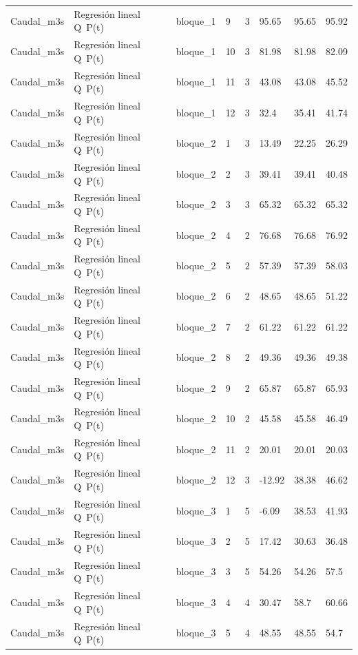 \begin{longtable}{llllllll}
Caudal\_m3s & Regresión lineal Q~P(t) & bloque\_1 & 9 & 3 & 95.65 & 95.65 & 95.92 \\
Caudal\_m3s & Regresión lineal Q~P(t) & bloque\_1 & 10 & 3 & 81.98 & 81.98 & 82.09 \\
Caudal\_m3s & Regresión lineal Q~P(t) & bloque\_1 & 11 & 3 & 43.08 & 43.08 & 45.52 \\
Caudal\_m3s & Regresión lineal Q~P(t) & bloque\_1 & 12 & 3 & 32.4 & 35.41 & 41.74 \\
Caudal\_m3s & Regresión lineal Q~P(t) & bloque\_2 & 1 & 3 & 13.49 & 22.25 & 26.29 \\
Caudal\_m3s & Regresión lineal Q~P(t) & bloque\_2 & 2 & 3 & 39.41 & 39.41 & 40.48 \\
Caudal\_m3s & Regresión lineal Q~P(t) & bloque\_2 & 3 & 3 & 65.32 & 65.32 & 65.32 \\
Caudal\_m3s & Regresión lineal Q~P(t) & bloque\_2 & 4 & 2 & 76.68 & 76.68 & 76.92 \\
Caudal\_m3s & Regresión lineal Q~P(t) & bloque\_2 & 5 & 2 & 57.39 & 57.39 & 58.03 \\
Caudal\_m3s & Regresión lineal Q~P(t) & bloque\_2 & 6 & 2 & 48.65 & 48.65 & 51.22 \\
Caudal\_m3s & Regresión lineal Q~P(t) & bloque\_2 & 7 & 2 & 61.22 & 61.22 & 61.22 \\
Caudal\_m3s & Regresión lineal Q~P(t) & bloque\_2 & 8 & 2 & 49.36 & 49.36 & 49.38 \\
Caudal\_m3s & Regresión lineal Q~P(t) & bloque\_2 & 9 & 2 & 65.87 & 65.87 & 65.93 \\
Caudal\_m3s & Regresión lineal Q~P(t) & bloque\_2 & 10 & 2 & 45.58 & 45.58 & 46.49 \\
Caudal\_m3s & Regresión lineal Q~P(t) & bloque\_2 & 11 & 2 & 20.01 & 20.01 & 20.03 \\
Caudal\_m3s & Regresión lineal Q~P(t) & bloque\_2 & 12 & 3 & -12.92 & 38.38 & 46.62 \\
Caudal\_m3s & Regresión lineal Q~P(t) & bloque\_3 & 1 & 5 & -6.09 & 38.53 & 41.93 \\
Caudal\_m3s & Regresión lineal Q~P(t) & bloque\_3 & 2 & 5 & 17.42 & 30.63 & 36.48 \\
Caudal\_m3s & Regresión lineal Q~P(t) & bloque\_3 & 3 & 5 & 54.26 & 54.26 & 57.5 \\
Caudal\_m3s & Regresión lineal Q~P(t) & bloque\_3 & 4 & 4 & 30.47 & 58.7 & 60.66 \\
Caudal\_m3s & Regresión lineal Q~P(t) & bloque\_3 & 5 & 4 & 48.55 & 48.55 & 54.7 \\

\end{longtable}
